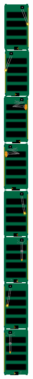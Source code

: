 \documentclass[12pt]{report}
\begin{document}
\includegraphics[scale=0.4]{sheet.png}
\end{document}
